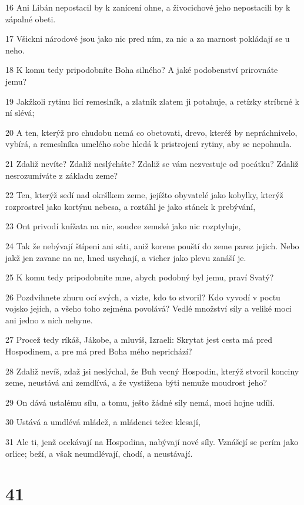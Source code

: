 \par 16 Ani Libán nepostacil by k zanícení ohne, a živocichové jeho nepostacili by k zápalné obeti.
\par 17 Všickni národové jsou jako nic pred ním, za nic a za marnost pokládají se u neho.
\par 18 K komu tedy pripodobníte Boha silného? A jaké podobenství prirovnáte jemu?
\par 19 Jakžkoli rytinu lící remeslník, a zlatník zlatem ji potahuje, a retízky stríbrné k ní slévá;
\par 20 A ten, kterýž pro chudobu nemá co obetovati, drevo, kteréž by nepráchnivelo, vybírá, a remeslníka umelého sobe hledá k pristrojení rytiny, aby se nepohnula.
\par 21 Zdaliž nevíte? Zdaliž neslýcháte? Zdaliž se vám nezvestuje od pocátku? Zdaliž nesrozumíváte z základu zeme?
\par 22 Ten, kterýž sedí nad okršlkem zeme, jejížto obyvatelé jako kobylky, kterýž rozprostrel jako kortýnu nebesa, a roztáhl je jako stánek k prebývání,
\par 23 Ont privodí knížata na nic, soudce zemské jako nic rozptyluje,
\par 24 Tak že nebývají štípeni ani sáti, aniž korene pouští do zeme parez jejich. Nebo jakž jen zavane na ne, hned usychají, a vicher jako plevu zanáší je.
\par 25 K komu tedy pripodobníte mne, abych podobný byl jemu, praví Svatý?
\par 26 Pozdvihnete zhuru ocí svých, a vizte, kdo to stvoril? Kdo vyvodí v poctu vojsko jejich, a všeho toho zejména povolává? Vedlé množství síly a veliké moci ani jedno z nich nehyne.
\par 27 Procež tedy ríkáš, Jákobe, a mluvíš, Izraeli: Skrytat jest cesta má pred Hospodinem, a pre má pred Boha mého neprichází?
\par 28 Zdaliž nevíš, zdaž jsi neslýchal, že Buh vecný Hospodin, kterýž stvoril konciny zeme, neustává ani zemdlívá, a že vystižena býti nemuže moudrost jeho?
\par 29 On dává ustalému sílu, a tomu, ješto žádné síly nemá, moci hojne udílí.
\par 30 Ustává a umdlévá mládež, a mládenci težce klesají,
\par 31 Ale ti, jenž ocekávají na Hospodina, nabývají nové síly. Vznášejí se perím jako orlice; beží, a však neumdlévají, chodí, a neustávají.

\chapter{41}

